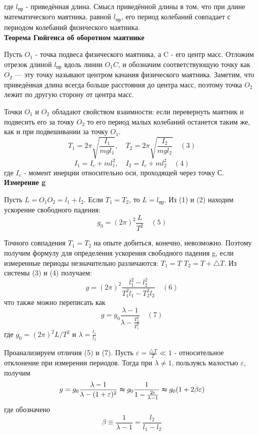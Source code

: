 \documentclass[12pt]{article}
\begin{document}
где $l_{\text{пр}}$ - приведённая длина. Смысл приведённой длины в том, что при длине математического маятника, равной $l_{\text{пр}}$, его период колебаний совпадает с периодом колебаний физического маятника.\\


\textbf{Теорема Гюйгенса об оборотном маятнике}


Пусть $O_{1}$ - точка подвеса физического маятника, а 
C - его центр масс. Отложим отрезок длиной $l_{пр}$ вдоль 
линии $O_{1}C$, и обозначим соответствующую точку как $O_{2}$ — эту точку называют центром качания физического маятника. Заметим, что приведённая длина всегда больше расстояния до центра масс, поэтому точка $O_{2}$ лежит по другую сторону от центра масс.


Точки $O_{1}$ и $O_{2}$ обладают свойством взаимности: 
если перевернуть маятник и подвесить его за точку $O_{2}$
то его период малых колебаний останется таким же, как 
и при подвешивании за точку $O_{1}$.
$$T_{1} = 2\pi\sqrt{\frac{I_{1}}{mgl_{1}}}, \quad T_{2} = 2\pi\sqrt{\frac{I_{2}}{mgl_{2}}} \quad (3)$$
$$I_{1} = I_{c} + ml_{1}^2, \quad I_{2} = I_{c} + ml_{2}^2 \quad (4)$$
где $I_{c}$ - момент инерции относительно оси, проходящей через точку С.\\


\textbf{Измерение g}

Пусть $L=O_{1}O_{2}=l_{1}+l_{2}$. Если $T_{1}=T_{2}$, то $L=l_{\text{пр}}$. Из (1) и (2) находим ускорение свободного падения:
$$g_{0} = (2\pi)^2\frac{L}{T^2} \quad (5)$$

Точного совпадения $T_{1} = T_{2}$ на опыте добиться, конечно, невозможно. Поэтому получим формулу для определения ускорения свободного падения g, если измеренные периоды незначительно различаются: $T_{1}=T$ $T_{2}=T+\triangle T$. Из системы (3) и (4) получаем:
$$g=(2\pi)^2\frac{l_{1}^2 - l_{2}^2}{T_{1}^2l_{1}-T_{2}^2l_{2}} \quad (6)$$
что также можно переписать как
$$g=g_{0}\frac{\lambda - 1}{\lambda - \frac{T_{2}^2}{T_{1}^2}} \quad (7)$$
где $g_{0}=(2\pi)^2L/T^2$ и $\lambda = \frac{l_{1}}{l_{2}}$

Проанализируем отличия (5) и (7). Пусть $\varepsilon =\frac{\triangle T}{T}\ll 1$ - относительное отклонение при измерении периодов. Тогда при $\lambda \neq 1$, пользуясь малостью $\varepsilon$, получим
$$g=g_{0}\frac{\lambda - 1}{\lambda - (1+\varepsilon)^2} \thickapprox g_{0}\frac{1}{1 - \frac{2\varepsilon}{\lambda - 1}} \thickapprox g_{0}(1+2\beta\varepsilon)$$
где обозначено
$$\beta \equiv \frac{1}{\lambda-1} = \frac{l_{2}}{l_{1}-l_{2}}$$
\end{document}
